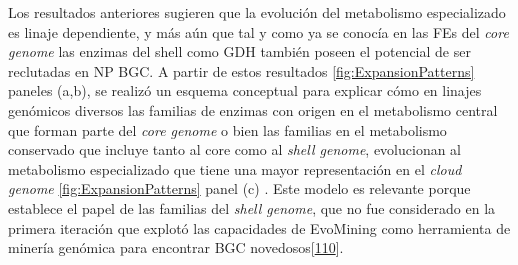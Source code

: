 \documentclass[12pt,twoside]{reedthesis}
\begin{document}
  Los resultados anteriores sugieren que la evolución del metabolismo
  especializado es linaje dependiente, y más aún que tal y como ya se
  conocía en las FEs del \emph{core genome} las enzimas del shell como GDH
  también poseen el potencial de ser reclutadas en NP BGC. A partir de
  estos resultados \autoref{fig:ExpansionPatterns} paneles (a,b), se
  realizó un esquema conceptual para explicar cómo en linajes genómicos
  diversos las familias de enzimas con origen en el metabolismo central
  que forman parte del \emph{core genome} o bien las familias en el
  metabolismo conservado que incluye tanto al core como al \emph{shell
  genome}, evolucionan al metabolismo especializado que tiene una mayor
  representación en el \emph{cloud genome} \autoref{fig:ExpansionPatterns}
  panel (c) . Este modelo es relevante porque establece el papel de las
  familias del \emph{shell genome}, que no fue considerado en la primera
  iteración que explotó las capacidades de EvoMining como herramienta de
  minería genómica para encontrar BGC
  novedosos{[}\protect\hyperlink{ref-navarro-munoz_computational_2018}{110}{]}.
  
\end{document}
